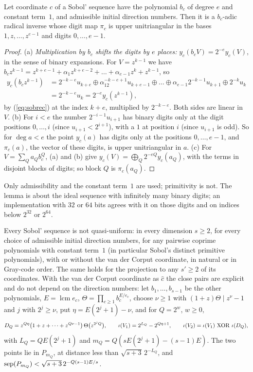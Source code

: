 \begin{lemma}\label{lem:sobol}
Let coordinate $c$ of a Sobol' sequence have the polynomial $b_c$ of degree $e$ and constant term~$1$, and admissible initial direction numbers. Then it is a $b_c$-adic radical inverse whose digit map $\pi_c$ is upper unitriangular in the bases $1,z,\dots,z^{e-1}$ and digits $0,\dots,e-1$.
\end{lemma}

\begin{proof}
(a) \emph{Multiplication by $b_c$ shifts the digits by $e$ places:} $y_c(b_cV)=2^{-e}y_c(V)$, in the sense of binary expansions. For $V=z^{k-1}$ we have $b_cz^{k-1}=z^{k+e-1}+\alpha_1z^{k+e-2}+\dots+\alpha_{e-1}z^k+z^{k-1}$, so
\[
\begin{aligned}
y_c(b_cz^{k-1})&=2^{-k-e}u_{k+e}\oplus\alpha_12^{-k-e+1}u_{k+e-1}\oplus\dots\oplus\alpha_{e-1}2^{-k-1}u_{k+1}\oplus2^{-k}u_k\\
&=2^{-k-e}u_k=2^{-e}y_c(z^{k-1}),
\end{aligned}
\]
by (\ref{eq:sobrec}) at the index $k+e$, multiplied by $2^{-k-e}$. Both sides are linear in~$V$.
(b) For $i<e$ the number $2^{-i-1}u_{i+1}$ has binary digits only at the digit positions $0,\dots,i$ (since $u_{i+1}<2^{i+1}$), with a $1$ at position $i$ (since $u_{i+1}$ is odd). So for $\deg a<e$ the point $y_c(a)$ has digits only at the positions $0,\dots,e-1$, and $\pi_c(a)$, the vector of these digits, is upper unitriangular in $a$.
(c) For $V=\sum_Qa_Qb_c^Q$, (a) and (b) give $y_c(V)=\bigoplus_Q2^{-eQ}y_c(a_Q)$, with the terms in disjoint blocks of digits; so block $Q$ is $\pi_c(a_Q)$.
\end{proof}

Only admissibility and the constant term~$1$ are used; primitivity is not. The lemma is about the ideal sequence with infinitely many binary digits; an implementation with $32$ or $64$ bits agrees with it on those digits and on indices below $2^{32}$ or $2^{64}$.

\begin{corollary}\label{cor:sobol}
Every Sobol' sequence is not quasi-uniform: in every dimension $s\ge2$, for every choice of admissible initial direction numbers, for any pairwise coprime polynomials with constant term~$1$ (in particular Sobol's distinct primitive polynomials), with or without the van der Corput coordinate, in natural or in Gray-code order. The same holds for the projection to any $s'\ge2$ of its coordinates. With the van der Corput coordinate as $\hat c$ the close pairs are explicit and do not depend on the direction numbers: let $b_1,\dots,b_{s-1}$ be the other polynomials, $E=\operatorname{lcm}e_c$, $\Theta=\prod_{c\ge1}b_c^{E/e_c}$, choose $\nu\ge1$ with $(1+z)\Theta\mid z^\nu-1$ and $j$ with $2^j\ge\nu$, put $\eta=E(2^j+1)-\nu$, and for $Q=2^w$, $w\ge0$,
\[
D_Q=z^{Q\eta}\bigl(1+z+\dots+z^{Q\nu-1}\bigr)\,\Theta\bigl(z^{2^jQ}\bigr),\qquad \ind{V_1}=2^{L_Q}-2^{Q\eta+1},\qquad \ind{V_2}=\ind{V_1}\ \mathrm{XOR}\ \ind{D_Q},
\]
with $L_Q=QE(2^j+1)$ and $m_Q=Q(sE(2^j+1)-(s-1)E)$. The two points lie in $P_{m_Q}$, at distance less than $\sqrt{s+3}\,2^{-L_Q}$, and $\operatorname{sep}(P_{m_Q})<\sqrt{s+3}\,2^{-Q(s-1)E/s}$.
\end{corollary}

